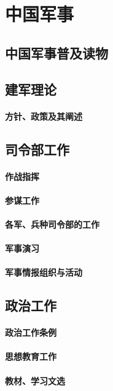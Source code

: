 \documentclass[UTF8]{../ApplicationUniverse}
\begin{document}
\chapter{中国军事}
\section{中国军事普及读物}
\section{建军理论}
    \subsubsection{方针、政策及其阐述}
\section{司令部工作}
    \subsubsection{作战指挥}
    \subsubsection{参谋工作}
    \subsubsection{各军、兵种司令部的工作}
    \subsubsection{军事演习}
    \subsubsection{军事情报组织与活动}
\section{政治工作}
    \subsubsection{政治工作条例}
    \subsubsection{思想教育工作}
    \subsubsection{教材、学习文选}
\end{document}
